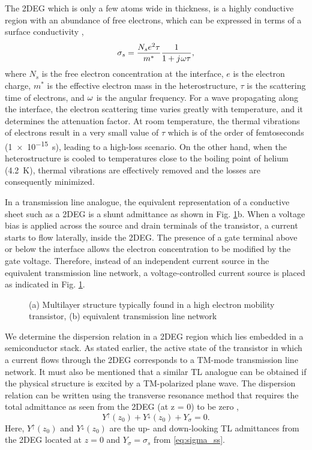 The 2DEG which is only a few atoms wide in thickness, is a highly conductive region with an abundance of free electrons, which can be expressed in terms of a surface conductivity \cite{Burke2000},
%
\begin{equation}
  \sigma_s = \frac{N_s e^2 \tau}{m^{\ast}}\frac{1}{1 + {j}\mkern1mu \omega \tau},
  \label{eq:sigma_ss}
\end{equation}
%
where $N_s$ is the free electron concentration at the interface, $e$ is the electron charge, $m^{\ast}$ is the effective electron mass in the heterostructure, $\tau$ is the scattering time of electrons, and $\omega$ is the angular frequency. For a wave propagating along the interface, the electron scattering time varies greatly with temperature, and it determines the attenuation factor. At room temperature, the thermal vibrations of electrons result in a very small value of $\tau$ which is of the order of femtoseconds (\SI{1e-15}{\s}), leading to a high-loss scenario. On the other hand, when the heterostructure is cooled to temperatures close to the boiling point of helium (\SI[round-precision=2]{4.2}{\kelvin}), thermal vibrations are effectively removed and the losses are consequently minimized.

In a transmission line analogue, the equivalent representation of a conductive sheet such as a 2DEG is a shunt admittance as shown in Fig. \ref{fig:TL_equivalent_poles}b. When a voltage bias is applied across the source and drain terminals of the transistor, a current starts to flow laterally, inside the 2DEG. The presence of a gate terminal above or below the interface allows the electron concentration to be modified by the gate voltage. Therefore, instead of an independent current source in the equivalent transmission line network, a voltage-controlled current source is placed as indicated in Fig. \ref{fig:TL_equivalent_poles}.
%
\begin{figure}[t!]
  \centering
  \def\svgwidth{\linewidth}
  
  \caption{(a) Multilayer structure typically found in a high electron mobility transistor, (b) equivalent transmission line network}
  \label{fig:TL_equivalent_poles}
\end{figure}
%
We determine the dispersion relation in a 2DEG region which lies embedded in a semiconductor stack. As stated earlier, the active state of the transistor in which a current flows through the 2DEG corresponds to a TM-mode transmission line network. It must also be mentioned that a similar TL analogue can be obtained if the physical structure is excited by a TM-polarized plane wave. The dispersion relation can be written using the transverse resonance method that requires the total admittance as seen from the 2DEG (at z = 0) to be zero \cite{Felsen1994,Gomez-Diaz2012},
%
\begin{equation}
  Y^{\uparrow}(z_0) + Y^{\downarrow}(z_0) + Y_{\sigma} = 0.
  \label{eq:dispersion}
\end{equation}
%
Here, $Y^{\uparrow}(z_0)$ and $Y^{\downarrow}(z_0)$ are the up- and down-looking TL admittances from the 2DEG located at $z = 0$ and $Y_{\sigma} = \sigma_s$ from \eqref{eq:sigma_ss}.


